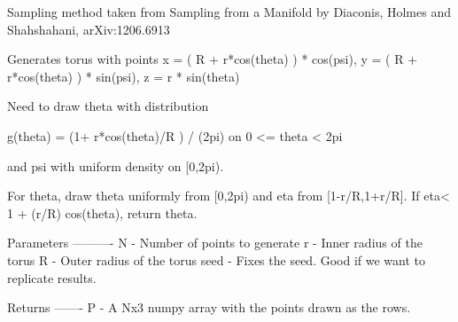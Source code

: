 \begin{DoxyVerb}Sampling method taken from Sampling from a Manifold by Diaconis, 
Holmes and Shahshahani, arXiv:1206.6913

Generates torus with points
x = ( R + r*cos(theta) ) * cos(psi),  
y = ( R + r*cos(theta) ) * sin(psi),
z = r * sin(theta)

Need to draw theta with distribution

g(theta) = (1+ r*cos(theta)/R ) / (2pi) on 0 <= theta < 2pi

and psi with uniform density on [0,2pi).

For theta, draw theta uniformly from [0,2pi) and 
eta from [1-r/R,1+r/R].  If eta< 1 + (r/R) cos(theta), return theta.

Parameters
----------
N -
    Number of points to generate
r -
    Inner radius of the torus
R -
    Outer radius of the torus
seed -
    Fixes the seed.  Good if we want to replicate results.


Returns
-------
P -  
    A Nx3 numpy array with the points drawn as the rows.\end{DoxyVerb}
 